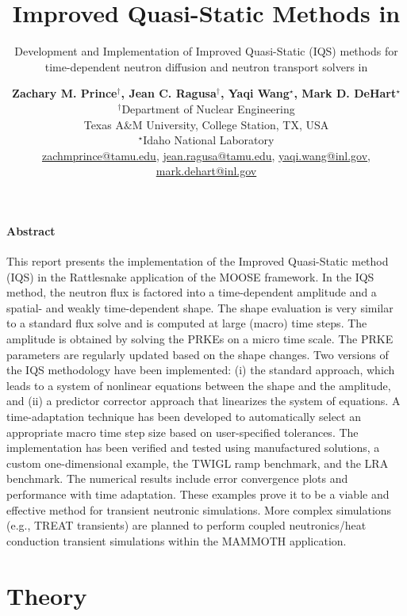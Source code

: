 \documentclass[12pt]{scrartcl}
\title{Improved Quasi-Static Methods in \rattlesnake}
\subtitle{Development and Implementation of Improved Quasi-Static (IQS) methods for time-dependent neutron diffusion and neutron transport solvers in \rattlesnake}
\author{ \normalsize
  \textbf{Zachary M. Prince$^\dagger$, Jean C. Ragusa$^\dagger$, Yaqi Wang$^\star$, Mark D. DeHart$^\star$} \\
 \normalsize $^\dagger$Department of Nuclear Engineering \\
 \normalsize Texas A\&M University, College Station, TX, USA\\
 \normalsize $^\star$Idaho National Laboratory\\
 \normalsize \href{mailto:zachmprince@tamu.edu}{zachmprince@tamu.edu}, \href{jean.ragusa@tamu.edu}{jean.ragusa@tamu.edu}, \href{yaqi.wang@inl.gov}{yaqi.wang@inl.gov}, \href{mark.dehart@inl.gov}{mark.dehart@inl.gov}
}
\newcommand{\rattlesnake}{Rattlesnake }
\begin{document}
\maketitle
{}

\paragraph*{Abstract}

This report presents  the implementation of the Improved Quasi-Static method (IQS) in the \rattlesnake application of the MOOSE framework.  In the IQS method, the neutron flux is factored into a time-dependent amplitude and a spatial- and weakly time-dependent shape.  The shape evaluation is very similar to a standard flux solve and is computed at large (macro) time steps. The amplitude is obtained by solving the PRKEs on a micro time scale. The PRKE parameters are regularly updated based on the shape changes.  Two versions of the IQS methodology have been implemented: (i) the standard approach, which leads to a system of nonlinear equations between the shape and the amplitude, and (ii) a predictor corrector approach that linearizes the system of equations. A time-adaptation technique has been developed to automatically select an appropriate macro time step size based on user-specified tolerances. The implementation has been verified and tested using manufactured solutions, a custom one-dimensional example, the TWIGL ramp benchmark, and the LRA benchmark.  The numerical results include error convergence plots and performance with time adaptation.  These examples prove it to be a viable and effective method for  transient neutronic simulations. More complex simulations (e.g., TREAT transients) are planned to perform coupled neutronics/heat conduction transient simulations within the MAMMOTH application.

\pagebreak

\section{Theory}
\end{document}
